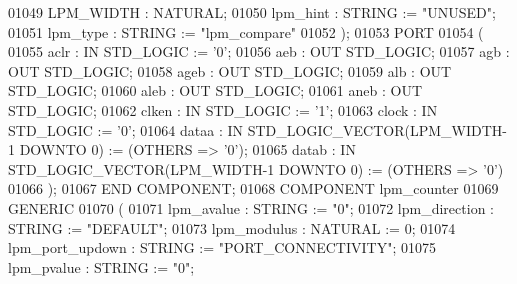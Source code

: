 \begin{DoxyCode}
{01049         LPM\_WIDTH   :   \textcolor{comment}{NATURAL};
01050         lpm\_hint    :   \textcolor{comment}{STRING} := \textcolor{keyword}{"UNUSED"};
01051         lpm\_type    :   \textcolor{comment}{STRING} := \textcolor{keyword}{"lpm\_compare"}
01052      );
01053      \textcolor{keywordflow}{PORT}
01054      ( 
01055         aclr    :   \textcolor{keywordflow}{IN} \textcolor{comment}{STD\_LOGIC} := '\textcolor{vhdllogic}{}\textcolor{vhdllogic}{0}';
01056         aeb :   \textcolor{keywordflow}{OUT} \textcolor{comment}{STD\_LOGIC};
01057         agb :   \textcolor{keywordflow}{OUT} \textcolor{comment}{STD\_LOGIC};
01058         ageb    :   \textcolor{keywordflow}{OUT} \textcolor{comment}{STD\_LOGIC};
01059         alb :   \textcolor{keywordflow}{OUT} \textcolor{comment}{STD\_LOGIC};
01060         aleb    :   \textcolor{keywordflow}{OUT} \textcolor{comment}{STD\_LOGIC};
01061         aneb    :   \textcolor{keywordflow}{OUT} \textcolor{comment}{STD\_LOGIC};
01062         clken   :   \textcolor{keywordflow}{IN} \textcolor{comment}{STD\_LOGIC} := '\textcolor{vhdllogic}{}\textcolor{vhdllogic}{1}';
01063         clock   :   \textcolor{keywordflow}{IN} \textcolor{comment}{STD\_LOGIC} := '\textcolor{vhdllogic}{}\textcolor{vhdllogic}{0}';
01064         dataa   :   \textcolor{keywordflow}{IN} \textcolor{comment}{STD\_LOGIC\_VECTOR}(LPM\_WIDTH\textcolor{vhdlchar}{-}\textcolor{vhdllogic}{}\textcolor{vhdllogic}{1} \textcolor{keywordflow}{DOWNTO} \textcolor{vhdllogic}{}\textcolor{vhdllogic}{0}) := (\textcolor{keywordflow}{OTHERS} => '\textcolor{vhdllogic}{}\textcolor{vhdllogic}{0}');
01065         datab   :   \textcolor{keywordflow}{IN} \textcolor{comment}{STD\_LOGIC\_VECTOR}(LPM\_WIDTH\textcolor{vhdlchar}{-}\textcolor{vhdllogic}{}\textcolor{vhdllogic}{1} \textcolor{keywordflow}{DOWNTO} \textcolor{vhdllogic}{}\textcolor{vhdllogic}{0}) := (\textcolor{keywordflow}{OTHERS} => '\textcolor{vhdllogic}{}\textcolor{vhdllogic}{0}')
01066      ); 
01067      \textcolor{keywordflow}{END} \textcolor{keywordflow}{COMPONENT};
01068      \textcolor{keywordflow}{COMPONENT}  lpm\_counter
01069      \textcolor{keywordflow}{GENERIC} 
01070      (
01071         lpm\_avalue  :   \textcolor{comment}{STRING} := "\textcolor{vhdllogic}{0}";
01072         lpm\_direction   :   \textcolor{comment}{STRING} := \textcolor{keyword}{"DEFAULT"};
01073         lpm\_modulus :   \textcolor{comment}{NATURAL} := \textcolor{vhdllogic}{}\textcolor{vhdllogic}{0};
01074         lpm\_port\_updown :   \textcolor{comment}{STRING} := \textcolor{keyword}{"PORT\_CONNECTIVITY"};
01075         lpm\_pvalue  :   \textcolor{comment}{STRING} := "\textcolor{vhdllogic}{0}";
}
\end{DoxyCode}
